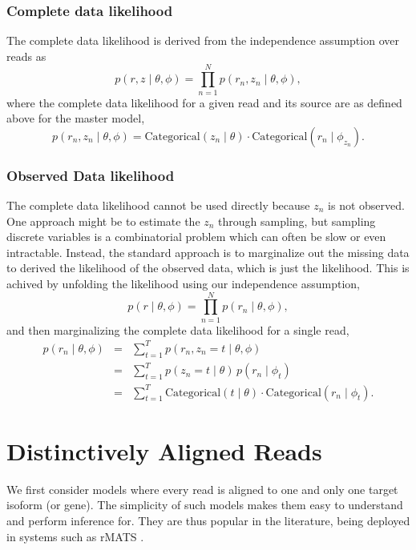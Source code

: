 \documentclass[11pt]{report}
\begin{document}
\subsection{Complete data likelihood}

The complete data likelihood is derived from the independence
assumption over reads as
\[
  p(r, z \mid \theta, \phi)
  = \prod_{n=1}^N p(r_n, z_n \mid \theta, \phi),
\]
where the complete data likelihood for a given read and its source are
as defined above for the master model,
\[
  p(r_n, z_n \mid \theta, \phi)
  = \textrm{Categorical}(z_n \mid \theta)
  \cdot \textrm{Categorical}(r_n \mid \phi_{z_n}).
\]

\subsection{Observed Data likelihood}

The complete data likelihood cannot be used directly because $z_n$ is
not observed.  One approach might be to estimate the $z_n$ through
sampling, but sampling discrete variables is a combinatorial problem
which can often be slow or even intractable.  Instead, the standard
approach is to marginalize out the missing data to derived the
likelihood of the observed data, which is just the likelihood.  This
is achived by unfolding the likelihood using our independence
assumption,
\[
  p(r \mid \theta, \phi)
  = \prod_{n=1}^N p(r_n \mid \theta, \phi),
\]
and then marginalizing the complete data likelihood for a single read,
\begin{eqnarray*}
  p(r_n \mid \theta, \phi)
  & = & \textstyle \sum_{t=1}^T p(r_n, z_n = t \mid \theta, \phi)
  \\[4pt]
  & = & \textstyle \sum_{t=1}^T p(z_n = t \mid \theta) \, p(r_n \mid \phi_t)
  \\[4pt]
  & = & \textstyle \sum_{t=1}^T \textrm{Categorical}(t \mid \theta)
        \cdot \textrm{Categorical}(r_n \mid \phi_t).
\end{eqnarray*}
  
\chapter{Distinctively Aligned Reads}

We first consider models where every read is aligned to one and only
one target isoform (or gene). The simplicity of such models makes them
easy to understand and perform inference for. They are thus popular in
the literature, being deployed in systems such as rMATS
\citep{shen2014rmats}.
\end{document}
